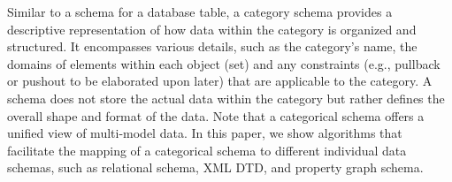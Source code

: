 










Similar to a schema for a database table, a category schema provides a descriptive representation of how data within the category is organized and structured. It encompasses various details, such as the category's name, the domains of elements within each object (set) and any constraints (e.g., pullback or pushout to be elaborated upon later) that are applicable to the category.  A schema does not store the actual data within the category but rather defines the overall shape and format of the data. Note that a categorical schema offers a unified view of multi-model data. In this paper, we show algorithms that facilitate the mapping of a categorical schema to different individual data schemas, such as relational schema, XML DTD, and property graph schema. 







